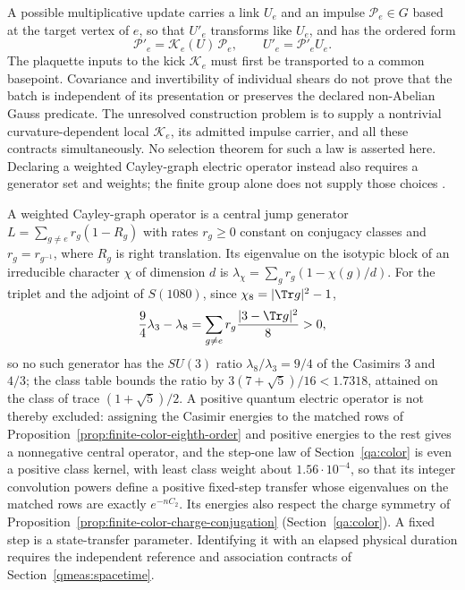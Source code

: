 A possible multiplicative update carries a link $U_e$ and an impulse
$\mathcal P_e\in G$ based at the target vertex of $e$, so that $U'_e$
transforms like $U_e$, and has the ordered form
\begin{equation}
 \mathcal P'_e=\mathcal K_e(U)\,\mathcal P_e,\qquad U'_e=\mathcal P'_eU_e.
 \label{eq:nonabelian-shears}
\end{equation}
The plaquette inputs to the kick $\mathcal K_e$ must first be transported to a common
basepoint. Covariance and invertibility of individual shears do not
prove that the batch is independent of its presentation or preserves
the declared non-Abelian Gauss predicate. The unresolved construction
problem is to supply a nontrivial curvature-dependent local $\mathcal K_e$, its
admitted impulse carrier, and all these contracts simultaneously.
\label{conj:a5-law}
No selection theorem for such a law is asserted here. Declaring a
weighted Cayley-graph electric operator instead also requires a
generator set and weights; the finite group alone does not supply
those choices \cite{MarianiPradhanErcolessi}.

\begin{remark}
\label{rem:finite-color-central-jumps}
A weighted Cayley-graph operator is a central jump generator
$L=\sum_{g\neq e}r_g(1-R_g)$ with rates $r_g\geq0$ constant on
conjugacy classes and $r_g=r_{g^{-1}}$, where $R_g$ is right
translation. Its eigenvalue on the isotypic block of an irreducible
character $\chi$ of dimension $d$ is $\lambda_\chi=\sum_gr_g(1-\chi(g)/d)$.
For the triplet and the adjoint of $S(1080)$, since
$\chi_8=|\Tr g|^2-1$,
\begin{equation}
 \frac94\lambda_3-\lambda_8=\sum_{g\neq e}r_g\frac{|3-\Tr g|^2}8>0,
 \label{eq:finite-color-central-jump}
\end{equation}
so no such generator has the $SU(3)$ ratio $\lambda_8/\lambda_3=9/4$
of the Casimirs $3$ and $4/3$; the class table bounds the ratio by
$3(7+\sqrt5)/16<1.7318$, attained on the class of trace
$(1+\sqrt5)/2$. A positive quantum electric operator is not thereby
excluded: assigning the Casimir energies to the matched rows of
Proposition~\ref{prop:finite-color-eighth-order} and positive energies to
the rest gives a nonnegative central operator, and
the step-one law of Section~\ref{qa:color} is even a positive class
kernel, with least class weight about $1.56\cdot10^{-4}$, so that its
integer convolution powers define a positive fixed-step transfer whose
eigenvalues on the matched rows are exactly $e^{-nC_2}$. Its energies also
respect the charge symmetry of
Proposition~\ref{prop:finite-color-charge-conjugation}
(Section~\ref{qa:color}). A fixed step is a state-transfer parameter. Identifying it with an elapsed
physical duration requires the independent reference and association
contracts of Section~\ref{qmeas:spacetime}.
\end{remark}

